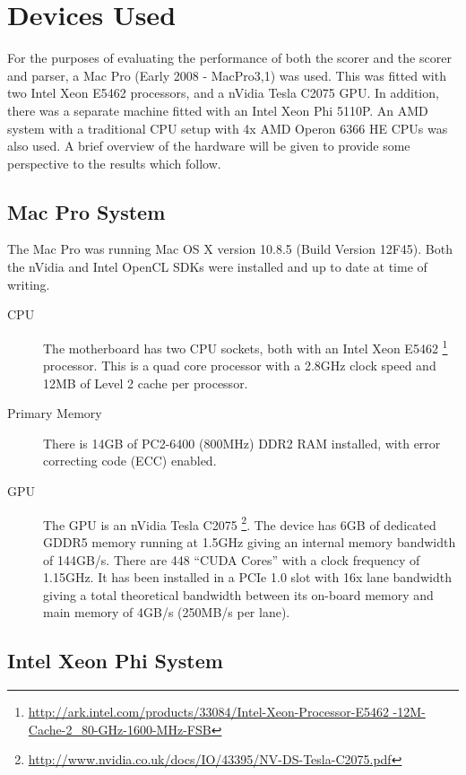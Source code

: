 \section{Devices Used}

For the purposes of evaluating the performance of both the scorer and the scorer
and parser, a Mac Pro (Early 2008 - MacPro3,1) was used. This was fitted with
two Intel Xeon E5462 processors, and a nVidia Tesla C2075 GPU. In addition,
there was a separate machine fitted with an Intel Xeon Phi 5110P. An AMD system
with a traditional CPU setup with 4x AMD Operon 6366 HE CPUs was also used. A
brief overview of the hardware will be given to provide some perspective to the
results which follow.

\subsection{Mac Pro System}

The Mac Pro was running Mac OS X version 10.8.5 (Build Version 12F45). Both the
nVidia and Intel OpenCL SDKs were installed and up to date at time of writing.

\begin{description}

\item[CPU] The motherboard has two CPU sockets, both with an Intel Xeon E5462
\footnote{\url{http://ark.intel.com/products/33084/Intel-Xeon-Processor-E5462
-12M-Cache-2_80-GHz-1600-MHz-FSB}} processor. This is a quad core processor with
a 2.8GHz clock speed and 12MB of Level 2 cache per processor.

\item[Primary Memory] There is 14GB of PC2-6400 (800MHz) DDR2 RAM installed,
with error correcting code (ECC) enabled.

\item[GPU] The GPU is an nVidia Tesla C2075
\footnote{\url{http://www.nvidia.co.uk/docs/IO/43395/NV-DS-Tesla-C2075.pdf}}.
The device has 6GB of dedicated GDDR5 memory running at 1.5GHz giving an
internal memory bandwidth of 144GB/s. There are 448 ``CUDA Cores'' with a clock
frequency of 1.15GHz. It has been installed in a PCIe 1.0 slot with 16x lane
bandwidth giving a total theoretical bandwidth between its on-board memory and
main memory of 4GB/s (250MB/s per lane).

\end{description}

\subsection{Intel Xeon Phi System}

